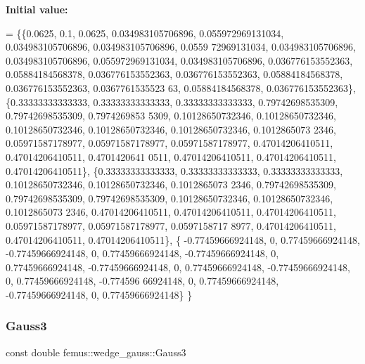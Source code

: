 {\bfseries Initial value\+:}
\begin{DoxyCode}
= \{\{0.0625, 0.1, 0.0625, 0.034983105706896, 0.055972969131034, 0.034983105706896, 0.034983105706896, 0.0559
      72969131034, 0.034983105706896, 0.034983105706896, 0.055972969131034, 0.034983105706896, 0.036776153552363, 
      0.05884184568378, 0.036776153552363, 0.036776153552363, 0.05884184568378, 0.036776153552363, 0.0367761535523
      63, 0.05884184568378, 0.036776153552363\},
    \{0.33333333333333, 0.33333333333333, 0.33333333333333, 0.79742698535309, 0.79742698535309, 0.7974269853
      5309, 0.10128650732346, 0.10128650732346, 0.10128650732346, 0.10128650732346, 0.10128650732346, 0.1012865073
      2346, 0.05971587178977, 0.05971587178977, 0.05971587178977, 0.47014206410511, 0.47014206410511, 0.4701420641
      0511, 0.47014206410511, 0.47014206410511, 0.47014206410511\},
    \{0.33333333333333, 0.33333333333333, 0.33333333333333, 0.10128650732346, 0.10128650732346, 0.1012865073
      2346, 0.79742698535309, 0.79742698535309, 0.79742698535309, 0.10128650732346, 0.10128650732346, 0.1012865073
      2346, 0.47014206410511, 0.47014206410511, 0.47014206410511, 0.05971587178977, 0.05971587178977, 0.0597158717
      8977, 0.47014206410511, 0.47014206410511, 0.47014206410511\},
    \{ -0.77459666924148, 0, 0.77459666924148, -0.77459666924148, 0, 0.77459666924148, -0.77459666924148, 0,
       0.77459666924148, -0.77459666924148, 0, 0.77459666924148, -0.77459666924148, 0, 0.77459666924148, -0.774596
      66924148, 0, 0.77459666924148, -0.77459666924148, 0, 0.77459666924148\}
  \}
\end{DoxyCode}
\mbox{\label{classfemus_1_1wedge__gauss_ac2d1c542cde6a0e3ba11113234b7e511}} 
\subsubsection{\texorpdfstring{Gauss3}{Gauss3}}
{\footnotesize\ttfamily const double femus\+::wedge\+\_\+gauss\+::\+Gauss3\hspace{0.3cm}{\ttfamily [static]}}

